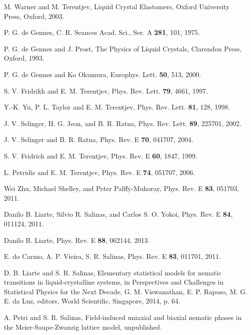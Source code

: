 \documentclass[aps,pre,reprint,amsmath,amssymbols,superscriptaddress,
nofootinbib]{revtex4-1}
\begin{document}
\begin{thebibliography}{99}                                                                                               %
M. Warner and M. Terentjev, Liquid Crystal Elastomers,
Oxford University Press, Oxford, 2003.

P. G. de Gennes, C. R. Seances Acad. Sci., Ser. A
\textbf{281}, 101, 1975.

P. G. de Gennes and J. Prost, The Physics of
Liquid Crystals, Clarendon Press, Oxford, 1993.

P. G. de Gennes and Ko Okumura, Europhys. Lett.
\textbf{50}, 513, 2000.

S. V. Fridrikh and E. M. Terentjev, Phys. Rev. Lett.
\textbf{79}, 4661, 1997.

Y.-K. Yu, P. L. Taylor and E. M. Terentjev, Phys. Rev. Lett.
\textbf{81}, 128, 1998.

J. V. Selinger, H. G. Jeon, and B. R. Ratna, Phys. Rev.
Lett. \textbf{89}, 225701, 2002.

J. V. Selinger and B. R. Ratna, Phys. Rev. E
\textbf{70}, 041707, 2004.

S. V. Fridrich and E. M. Terentjev, Phys. Rev. E
\textbf{60}, 1847, 1999.

L. Petridis and E. M. Terentjev, Phys. Rev. E
\textbf{74}, 051707, 2006.

Wei Zhu, Michael Shelley, and Peter Palffy-Muhoray, Phys.
Rev. E \textbf{83}, 051703, 2011.

Danilo B. Liarte, Silvio R. Salinas, and Carlos S. O.
Yokoi, Phys. Rev. E \textbf{84}, 011124, 2011.

Danilo B. Liarte, Phys. Rev. E \textbf{88}, 062144, 2013.

E. do Carmo, A. P. Vieira, S. R. Salinas, Phys. Rev. E
\textbf{83}, 011701, 2011.

D. B. Liarte and S. R. Salinas, Elementary statistical
models for nematic transitions in liquid-crystalline systems, in Perspectives
and Challenges in Statistical Physics for the Next Decade, G. M. Viswanathan,
E. P. Raposo, M. G. E. da Luz, editors, World Scientific, Singapore, 2014, p. 64.

A. Petri and S. R. Salinas, Field-induced uniaxial and
biaxial nematic phases in the Meier-Saupe-Zwanzig lattice model, unpublished.


\end{thebibliography}
\end{document}
